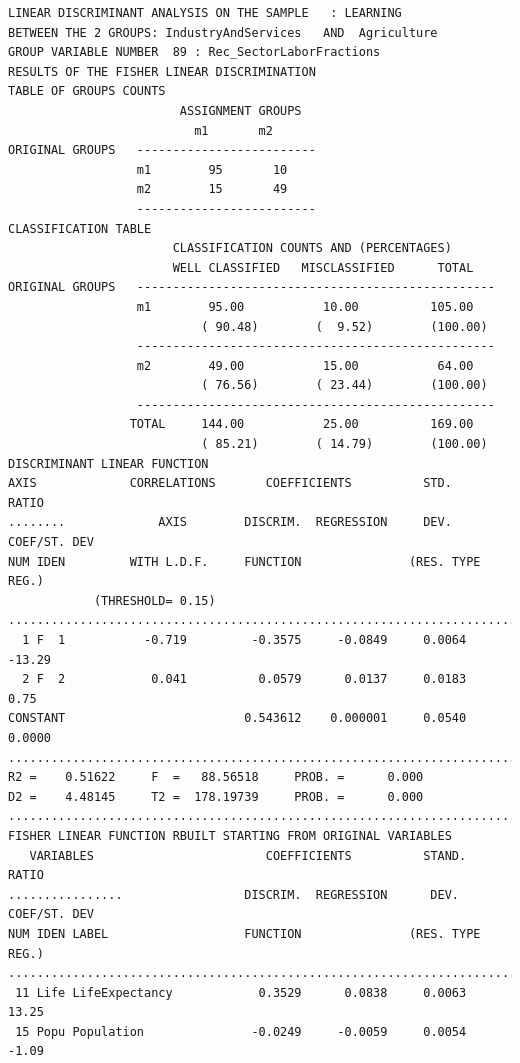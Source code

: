 \documentclass[a4paper,10pt,twocolumn]{article}
\begin{document}
\begin{landscape}
\begin{verbatim}
LINEAR DISCRIMINANT ANALYSIS ON THE SAMPLE   : LEARNING
BETWEEN THE 2 GROUPS: IndustryAndServices   AND  Agriculture
GROUP VARIABLE NUMBER  89 : Rec_SectorLaborFractions
RESULTS OF THE FISHER LINEAR DISCRIMINATION
TABLE OF GROUPS COUNTS
                        ASSIGNMENT GROUPS
                          m1       m2
ORIGINAL GROUPS   -------------------------
                  m1        95       10
                  m2        15       49
                  -------------------------
CLASSIFICATION TABLE
                       CLASSIFICATION COUNTS AND (PERCENTAGES)
                       WELL CLASSIFIED   MISCLASSIFIED      TOTAL
ORIGINAL GROUPS   --------------------------------------------------
                  m1        95.00           10.00          105.00
                           ( 90.48)        (  9.52)        (100.00)
                  --------------------------------------------------
                  m2        49.00           15.00           64.00
                           ( 76.56)        ( 23.44)        (100.00)
                  --------------------------------------------------
                 TOTAL     144.00           25.00          169.00
                           ( 85.21)        ( 14.79)        (100.00)
DISCRIMINANT LINEAR FUNCTION
AXIS             CORRELATIONS       COEFFICIENTS          STD.     RATIO
........             AXIS        DISCRIM.  REGRESSION     DEV.   COEF/ST. DEV
NUM IDEN         WITH L.D.F.     FUNCTION               (RES. TYPE REG.)
            (THRESHOLD= 0.15)
..............................................................................
  1 F  1           -0.719         -0.3575     -0.0849     0.0064 -13.29
  2 F  2            0.041          0.0579      0.0137     0.0183   0.75
CONSTANT                         0.543612    0.000001     0.0540 0.0000
..............................................................................
R2 =    0.51622     F  =   88.56518     PROB. =      0.000
D2 =    4.48145     T2 =  178.19739     PROB. =      0.000
..............................................................................
FISHER LINEAR FUNCTION RBUILT STARTING FROM ORIGINAL VARIABLES
   VARIABLES                        COEFFICIENTS          STAND.    RATIO
................                 DISCRIM.  REGRESSION      DEV.  COEF/ST. DEV
NUM IDEN LABEL                   FUNCTION               (RES. TYPE REG.)
..............................................................................
 11 Life LifeExpectancy            0.3529      0.0838     0.0063  13.25
 15 Popu Population               -0.0249     -0.0059     0.0054  -1.09

\end{verbatim}
\end{landscape}
\end{document}
